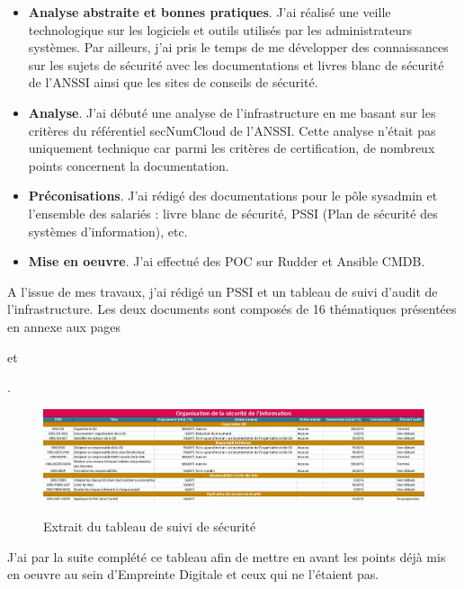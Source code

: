\documentclass[12pt, a4paper, twoside]{article}
\begin{document}
\begin{itemize}
    \item \textbf{Analyse abstraite et bonnes pratiques}. J'ai réalisé une veille technologique sur les logiciels et outils utilisés par les administrateurs systèmes. 
    Par ailleurs, j'ai pris le temps de me développer des connaissances sur les sujets de sécurité avec les documentations et livres blanc de sécurité de l'\gls{ANSSI} ainsi que les sites de conseils de sécurité.
    \item \textbf{Analyse}. J'ai débuté une analyse de l'infrastructure en me basant sur les critères du référentiel secNumCloud de l'\gls{ANSSI}. 
    Cette analyse n'était pas uniquement technique car parmi les critères de certification, de nombreux points concernent la documentation.
    \item \textbf{Préconisations}. J'ai rédigé des documentations pour le pôle \gls{sysadmin} et l'ensemble des salariés : livre blanc de sécurité, \gls{PSSI} (Plan de sécurité des systèmes d'information), etc.
    \item \textbf{Mise en oeuvre}. J'ai effectué des \gls{POC} sur Rudder et \gls{Ansible CMDB}.
\end{itemize}

A l'issue de mes travaux, j'ai rédigé un \gls{PSSI} et un tableau de suivi d'audit de l'infrastructure. 
Les deux documents sont composés de 16 thématiques présentées en annexe aux pages \begin{hilite} \pageref{tab:16thematiques1} \end{hilite} et \begin{hilite} \pageref{tab:16thematiques2} \end{hilite}.
\begin{figure}[!ht]
    \centering
    \includegraphics[width=\textwidth]{src/table_ssi.png}
    \label{fig:pssi_table}
    \caption{Extrait du tableau de suivi de sécurité}
\end{figure}

J'ai par la suite complété ce tableau afin de mettre en avant les points déjà mis en oeuvre au sein d'Empreinte Digitale et ceux qui ne l'étaient pas.
\end{document}
